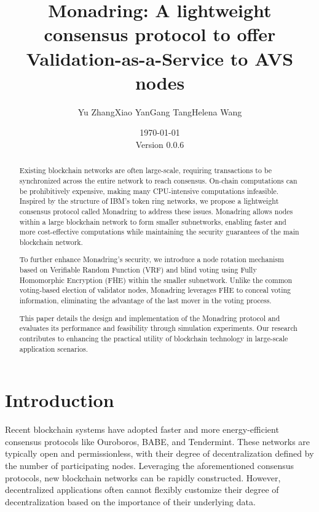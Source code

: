 \documentclass[11pt]{article}
\newcommand{\version}{\small Version 0.0.6}
\begin{document}
\title{Monadring: A lightweight consensus protocol to offer Validation-as-a-Service to AVS nodes}
\author{Yu Zhang\qquad Xiao Yan\qquad Gang Tang\qquad Helena Wang}
\date{\small \today\\\version}
\maketitle

\begin{abstract}

  
Existing blockchain networks are often large-scale, requiring transactions to be synchronized across the entire network to reach consensus. On-chain computations can be prohibitively expensive, making many CPU-intensive computations infeasible. Inspired by the structure of IBM’s token ring networks, we propose a lightweight consensus protocol called Monadring to address these issues. Monadring allows nodes within a large blockchain network to form smaller subnetworks, enabling faster and more cost-effective computations while maintaining the security guarantees of	the	main	blockchain	network.

To further enhance Monadring's security, we introduce a node rotation mechanism based on Verifiable Random Function (VRF) and blind voting using Fully Homomorphic Encryption (FHE) within the smaller subnetwork. Unlike the common voting-based election of validator nodes, Monadring leverages FHE to conceal voting information, eliminating the advantage of the  last  mover  in  the  voting  process.

This paper details the design and implementation of the Monadring protocol and evaluates its performance and feasibility through simulation experiments. Our research contributes to enhancing the practical utility of blockchain technology in large-scale application scenarios.



\end{abstract}

\section{Introduction}
Recent blockchain systems have adopted faster and more energy-efficient consensus protocols like Ouroboros\cite{cryptoeprint:2016/889}, BABE\cite{burdges2020overview}, and Tendermint\cite{buchman2016tendermint}. These networks are typically open and permissionless, with their degree of decentralization defined by the number of participating nodes. Leveraging the aforementioned consensus protocols, new blockchain networks can be rapidly constructed. However, decentralized applications often cannot flexibly customize their degree of decentralization based on the importance of their underlying data.
\end{document}
